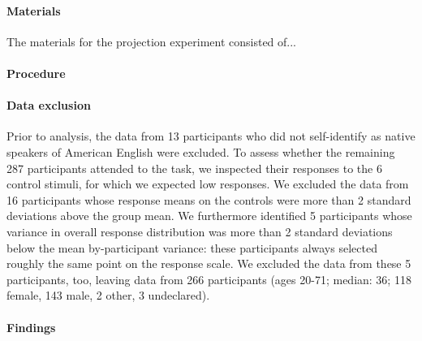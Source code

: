 \documentclass[11pt,fleqn]{article}
\newcommand{\6}{\mbox{$[\hspace*{-.6mm}[$}}
\newcommand{\9}{\mbox{$]\hspace*{-.6mm}]$}}
\begin{document}
\paragraph{Materials} The materials for the projection experiment consisted of...

\paragraph{Procedure}

\paragraph{Data exclusion}
Prior to analysis, the data from 13 participants who did not self-identify as native speakers of American English were excluded. To assess whether the remaining 287 participants attended to the task, we inspected their responses to the 6 control stimuli, for which we expected low responses. We excluded the data from 16 participants whose response means on the controls were more than 2 standard deviations above the group mean. We furthermore identified 5 participants whose variance in overall response distribution was more than 2 standard deviations below the mean by-participant variance: these participants always selected roughly the same point on the response scale. We excluded the data from these 5 participants, too, leaving data from 266 participants (ages 20-71; median: 36; 118 female, 143 male, 2 other, 3 undeclared).

\paragraph{Findings}




\end{document}
